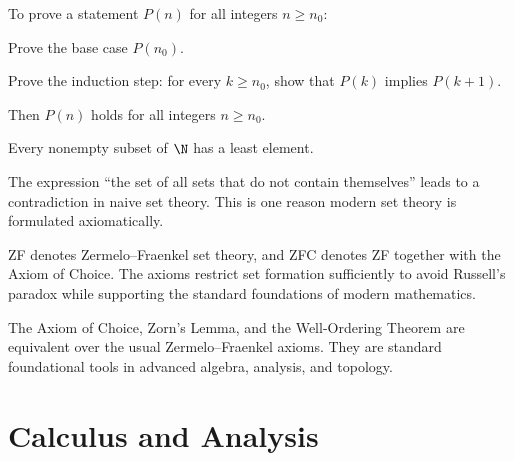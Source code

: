     \begin{algorithm}
        To prove a statement $P(n)$ for all integers $n\geq n_0$:
        \begin{bookitems}
            \item Prove the base case $P(n_0)$.
            \item Prove the induction step: for every $k\geq n_0$, show that
                  $P(k)$ implies $P(k+1)$.
        \end{bookitems}
        Then $P(n)$ holds for all integers $n\geq n_0$.
    \end{algorithm}

    \begin{theorem}
        Every nonempty subset of $\N$ has a least element.
    \end{theorem}

    \begin{fact}
        The expression ``the set of all sets that do not contain themselves''
        leads to a contradiction in naive set theory. This is one reason modern
        set theory is formulated axiomatically.
    \end{fact}

    \begin{fact}
        ZF denotes Zermelo--Fraenkel set theory, and ZFC denotes ZF together
        with the Axiom of Choice. The axioms restrict set formation sufficiently
        to avoid Russell's paradox while supporting the standard foundations of
        modern mathematics.
    \end{fact}

    \begin{fact}
        The Axiom of Choice, Zorn's Lemma, and the Well-Ordering Theorem are
        equivalent over the usual Zermelo--Fraenkel axioms. They are standard
        foundational tools in advanced algebra, analysis, and topology.
    \end{fact}

    \chapter{Calculus and Analysis}



